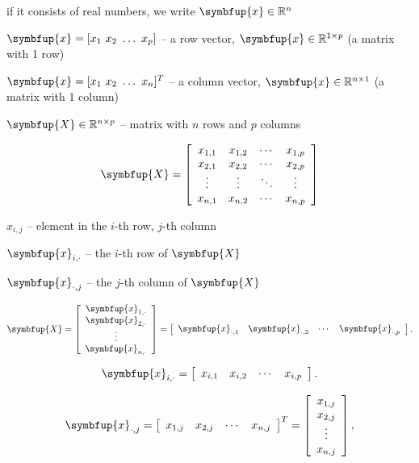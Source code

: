 \documentclass[10pt,b5paper,krantz1]{krantz}
\renewcommand{\mathbf}[1]{\symbfup{#1}}
\renewcommand{\boldsymbol}[1]{\symbfup{#1}}
\begin{document}
if it consists of real numbers, we write \(\boldsymbol{x}\in\mathbb{R}^n\)

\(\mathbf{x}=[x_1\ x_2\ \dots\ x_p]\) -- a row vector, \(\mathbf{x}\in\mathbb{R}^{1\times p}\)
(a matrix with 1 row)

\(\mathbf{x}=[x_1\ x_2\ \dots\ x_n]^T\) -- a column vector, \(\mathbf{x}\in\mathbb{R}^{n\times 1}\)
(a matrix with 1 column)

\(\mathbf{X}\in\mathbb{R}^{n\times p}\) -- matrix with \(n\) rows and \(p\) columns

\[
\mathbf{X}=
\left[
\begin{array}{cccc}
x_{1,1} & x_{1,2} & \cdots & x_{1,p} \\
x_{2,1} & x_{2,2} & \cdots & x_{2,p} \\
\vdots & \vdots & \ddots & \vdots \\
x_{n,1} & x_{n,2} & \cdots & x_{n,p} \\
\end{array}
\right]
\]

\(x_{i,j}\) -- element in the \(i\)-th row, \(j\)-th column

\(\mathbf{x}_{i,\cdot}\) -- the \(i\)-th row of \(\mathbf{X}\)

\(\mathbf{x}_{\cdot,j}\) -- the \(j\)-th column of \(\mathbf{X}\)

\[
\mathbf{X}=\left[
\begin{array}{c}
\mathbf{x}_{1,\cdot} \\
\mathbf{x}_{2,\cdot} \\
\vdots\\
\mathbf{x}_{n,\cdot} \\
\end{array}
\right]
=
\left[
\begin{array}{cccc}
\mathbf{x}_{\cdot,1} &
\mathbf{x}_{\cdot,2} &
\cdots &
\mathbf{x}_{\cdot,p} \\
\end{array}
\right].
\]

\[
\mathbf{x}_{i,\cdot} = \left[
\begin{array}{cccc}
x_{i,1} &
x_{i,2} &
\cdots &
x_{i,p} \\
\end{array}
\right].
\]

\[
\mathbf{x}_{\cdot,j} = \left[
\begin{array}{cccc}
x_{1,j} &
x_{2,j} &
\cdots &
x_{n,j} \\
\end{array}
\right]^T=\left[
\begin{array}{c}
{x}_{1,j} \\
{x}_{2,j} \\
\vdots\\
{x}_{n,j} \\
\end{array}
\right],
\]
\end{document}

